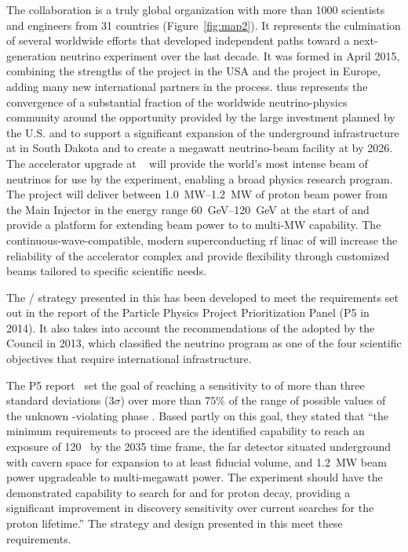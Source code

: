 The  collaboration is a truly global organization with more than \num{1000} scientists and engineers from \num{31} countries (Figure~\ref{fig:map2}). It represents the culmination of several worldwide efforts that developed independent paths toward a next-generation  neutrino experiment over the last decade. It was formed in April 2015, combining the strengths of the  project in the USA and the  project in Europe, adding many new international partners in the process.  thus represents the convergence of a substantial fraction of the worldwide neutrino-physics community around the opportunity provided by the large investment planned by the U.S.  and  to support a significant expansion of the underground infrastructure at  in South Dakota and to create a megawatt neutrino-beam facility at  by 2026. 
The  accelerator upgrade at ~\cite{pip2-2013} will provide the world's most intense beam of neutrinos for use by the %
 experiment, enabling a broad physics research program.  
The  project will deliver between \SIrange{1.0}{1.2}{\MW} of proton beam power from the  Main Injector in the energy range \SIrange{60}{120}{\GeV} at the start of  and provide a platform for extending beam power to  to multi-MW capability. %
The continuous-wave-compatible, modern superconducting rf linac of  will increase the reliability of the  accelerator complex and provide flexibility through customized  beams tailored to specific scientific needs.  

The / strategy presented in this  has been developed to meet the requirements set out in the report of the Particle Physics Project Prioritization Panel (P5 in 2014). It also takes into account the recommendations of the  adopted by the  Council in 2013, which classified the  neutrino program as one of the four scientific objectives that require international infrastructure.

The P5 report~\cite{p5report} set the goal of reaching a sensitivity to  of more than three standard deviations (\num{3}$\sigma$) over more than $75\%$ 
of the range of possible values of the unknown -violating phase \deltacp.
Based partly on this goal, they stated that ``the 
minimum requirements to proceed are the identified capability to reach an exposure 
of \num{120}~\ktMWyr{} by the 2035 time frame, the far detector situated underground 
with cavern space for expansion to at least \fdfiducialmass {} fiducial volume, and \SI{1.2}{MW} 
beam power upgradeable to multi-megawatt power.
The experiment should have the demonstrated 
capability to search for  and for proton decay, providing a significant 
improvement in discovery sensitivity over current searches for the proton lifetime.'' The strategy and design presented in this  meet these requirements.

